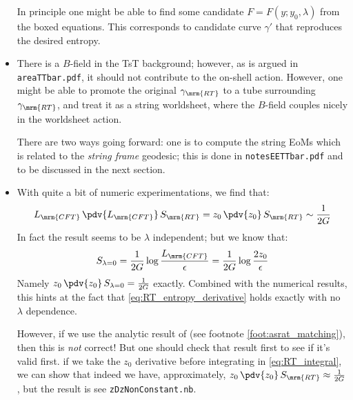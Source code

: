\documentclass[a4paper
	,10pt
]{article}
\begin{document}
\begin{itemize}
	In principle one might be able to find some candidate $F = F(y;y_0,\lambda)$ from the boxed equations. This corresponds to candidate curve $\gamma'$ that reproduces the desired entropy. 
	
	\item There is a $B$-field in the TsT background; however, as is argued in \texttt{areaTTbar.pdf}, it should not contribute to the on-shell action. However, one might be able to promote the original $\gamma_\mrm{RT}$ to a tube surrounding $\gamma_\mrm{RT}$, and treat it as a string worldsheet, where the $B$-field couples nicely in the worldsheet action. 
	
	There are two ways going forward: one is to compute the string EoMs which is related to the \textit{string frame} geodesic; this is done in \texttt{notesEETTbar.pdf} and to be discussed in the next section. 
	
	
	\item With quite a bit of numeric experimentations, we find that:
	\begin{equation}
		L_\mrm{CFT}\,\pdv{L_\mrm{CFT}}\,S_\mrm{RT}
		= z_0\,\pdv{z_0}\,S_\mrm{RT}
		\sim \frac{1}{2G}
	\label{eq:RT_entropy_derivative}
	\end{equation}
	In fact the result seems to be $\lambda$ independent; but we know that:
	\begin{equation}
		S_{\lambda = 0}
		= \frac{1}{2G}
			\log \frac{L_\mrm{CFT}}{\epsilon}
		= \frac{1}{2G}
			\log \frac{2z_0}{\epsilon}
	\end{equation}
	Namely $
		z_0\,\pdv{z_0}\,S_{\lambda = 0}
		= \frac{1}{2G}
	$ exactly. Combined with the numerical results, this hints at the fact that \eqref{eq:RT_entropy_derivative} holds exactly with no $\lambda$ dependence. 
	
	However, if we use the analytic result of \cite{Asrat:2019end} (see footnote \ref{foot:asrat_matching}), then this is \textit{not} correct! But one should check that result first to see if it's valid first.
	 if we take the $z_0$ derivative before integrating in \eqref{eq:RT_integral}, we can show that indeed we have, approximately, $
		z_0\,\pdv{z_0}\,S_\mrm{RT}
		\approx \frac{1}{2G}
	$, but the result is  see \texttt{zDzNonConstant.nb}. 
	

\end{itemize}
\end{document}
